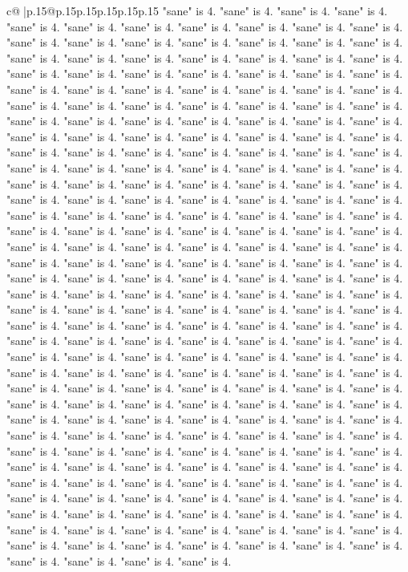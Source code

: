 \documentclass{article}
\begin{document}
{\begin{supertabular}{c@{$\;$}|p{.15\linewidth}@{}p{.15\linewidth}p{.15\linewidth}p{.15\linewidth}p{.15\linewidth}p{.15\linewidth}}
{{{"sane" is 4. "sane" is 4. "sane" is 4. "sane" is 4. "sane" is 4. "sane" is 4. "sane" is 4. "sane" is 4. "sane" is 4. "sane" is 4. "sane" is 4. "sane" is 4. "sane" is 4. "sane" is 4. "sane" is 4. "sane" is 4. "sane" is 4. "sane" is 4. "sane" is 4. "sane" is 4. "sane" is 4. "sane" is 4. "sane" is 4. "sane" is 4. "sane" is 4. "sane" is 4. "sane" is 4. "sane" is 4. "sane" is 4. "sane" is 4. "sane" is 4. "sane" is 4. "sane" is 4. "sane" is 4. "sane" is 4. "sane" is 4. "sane" is 4. "sane" is 4. "sane" is 4. "sane" is 4. "sane" is 4. "sane" is 4. "sane" is 4. "sane" is 4. "sane" is 4. "sane" is 4. "sane" is 4. "sane" is 4. "sane" is 4. "sane" is 4. "sane" is 4. "sane" is 4. "sane" is 4. "sane" is 4. "sane" is 4. "sane" is 4. "sane" is 4. "sane" is 4. "sane" is 4. "sane" is 4. "sane" is 4. "sane" is 4. "sane" is 4. "sane" is 4. "sane" is 4. "sane" is 4. "sane" is 4. "sane" is 4. "sane" is 4. "sane" is 4. "sane" is 4. "sane" is 4. "sane" is 4. "sane" is 4. "sane" is 4. "sane" is 4. "sane" is 4. "sane" is 4. "sane" is 4. "sane" is 4. "sane" is 4. "sane" is 4. "sane" is 4. "sane" is 4. "sane" is 4. "sane" is 4. "sane" is 4. "sane" is 4. "sane" is 4. "sane" is 4. "sane" is 4. "sane" is 4. "sane" is 4. "sane" is 4. "sane" is 4. "sane" is 4. "sane" is 4. "sane" is 4. "sane" is 4. "sane" is 4. "sane" is 4. "sane" is 4. "sane" is 4. "sane" is 4. "sane" is 4. "sane" is 4. "sane" is 4. "sane" is 4. "sane" is 4. "sane" is 4. "sane" is 4. "sane" is 4. "sane" is 4. "sane" is 4. "sane" is 4. "sane" is 4. "sane" is 4. "sane" is 4. "sane" is 4. "sane" is 4. "sane" is 4. "sane" is 4. "sane" is 4. "sane" is 4. "sane" is 4. "sane" is 4. "sane" is 4. "sane" is 4. "sane" is 4. "sane" is 4. "sane" is 4. "sane" is 4. "sane" is 4. "sane" is 4. "sane" is 4. "sane" is 4. "sane" is 4. "sane" is 4. "sane" is 4. "sane" is 4. "sane" is 4. "sane" is 4. "sane" is 4. "sane" is 4. "sane" is 4. "sane" is 4. "sane" is 4. "sane" is 4. "sane" is 4. "sane" is 4. "sane" is 4. "sane" is 4. "sane" is 4. "sane" is 4. "sane" is 4. "sane" is 4. "sane" is 4. "sane" is 4. "sane" is 4. "sane" is 4. "sane" is 4. "sane" is 4. "sane" is 4. "sane" is 4. "sane" is 4. "sane" is 4. "sane" is 4. "sane" is 4. "sane" is 4. "sane" is 4. "sane" is 4. "sane" is 4. "sane" is 4. "sane" is 4. "sane" is 4. "sane" is 4. "sane" is 4. "sane" is 4. "sane" is 4. "sane" is 4. "sane" is 4. "sane" is 4. "sane" is 4. "sane" is 4. "sane" is 4. "sane" is 4. "sane" is 4. "sane" is 4. "sane" is 4. "sane" is 4. "sane" is 4. "sane" is 4. "sane" is 4. "sane" is 4. "sane" is 4. "sane" is 4. "sane" is 4. "sane" is 4. "sane" is 4. "sane" is 4. "sane" is 4. "sane" is 4. "sane" is 4. "sane" is 4. "sane" is 4. "sane" is 4. "sane" is 4. "sane" is 4. "sane" is 4. "sane" is 4. "sane" is 4. "sane" is 4. "sane" is 4. "sane" is 4. "sane" is 4. "sane" is 4. "sane" is 4. "sane" is 4. "sane" is 4. "sane" is 4. "sane" is 4. "sane" is 4. "sane" is 4. "sane" is 4. "sane" is 4. "sane" is 4. "sane" is 4. "sane" is 4. "sane" is 4. "sane" is 4. "sane" is 4. "sane" is 4. "sane" is 4. "sane" is 4. "sane" is 4. "sane" is 4. "sane" is 4. "sane" is 4. "sane" is 4. "sane" is 4. "sane" is 4. "sane" is 4. "sane" is 4. "sane" is 4. "sane" is 4. "sane" is 4. }}}
\end{supertabular}}
\end{document}
